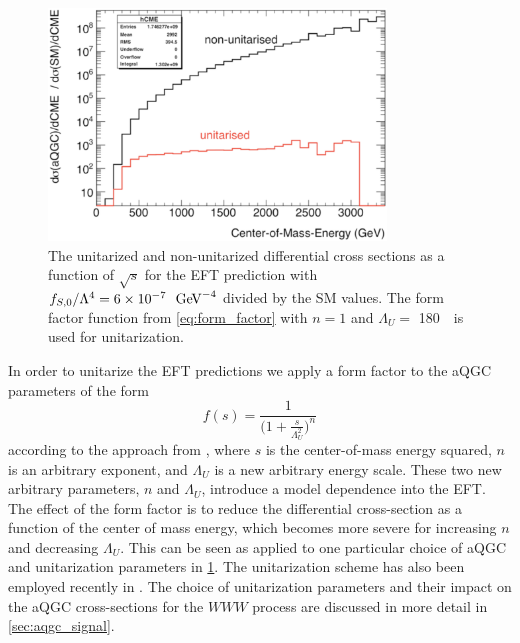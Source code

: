 \begin{figure}[htp]
  \centering
  \includegraphics[width=0.8\textwidth]{figures/signal_section/Unitarity_check.eps}  
  \caption{The unitarized and non-unitarized differential cross
    sections as a function of $\sqrt{s}$ for the EFT prediction
    with $f_{S,0}/\Lambda^4
    = 6\times 10^{-7}~\GeV^{-4}$ divided by the SM values. The
    form factor function from \eqn\eqref{eq:form_factor}
    with $n=1$ and $\Lambda_{U} =$ 180~\GeV~is
    used for unitarization.  }
\label{fig:unitarity_example}
\end{figure}


In order to unitarize the EFT predictions we apply a form factor
to the aQGC parameters of the form
\begin{equation}
f(s) = \frac{1}{\Big( 1 + \frac{s}{\Lambda_U^2} \Big)^{n}}
\label{eq:form_factor}
\end{equation}
according to the approach from \cite{Eboli:2003nq}, 
where $s$ is the center-of-mass energy squared, $n$ is an arbitrary
exponent, and $\Lambda_U$ is a new arbitrary energy scale.
These two new arbitrary parameters, $n$ and $\Lambda_U$, 
introduce a model dependence into the EFT. The effect of the form
factor is to reduce the differential cross-section as a
function of the center of mass energy, which becomes more severe
for increasing $n$ and decreasing $\Lambda_U$.
This can be seen as applied to one particular choice of aQGC
and unitarization parameters in \fig\ref{fig:unitarity_example}.
The unitarization
scheme has also been employed recently in \cite{PhysRevLett.115.031802}.
The choice of unitarization parameters and their impact on the 
aQGC cross-sections for the $WWW$ process are discussed in more detail
in \sec\ref{sec:aqgc_signal}.




